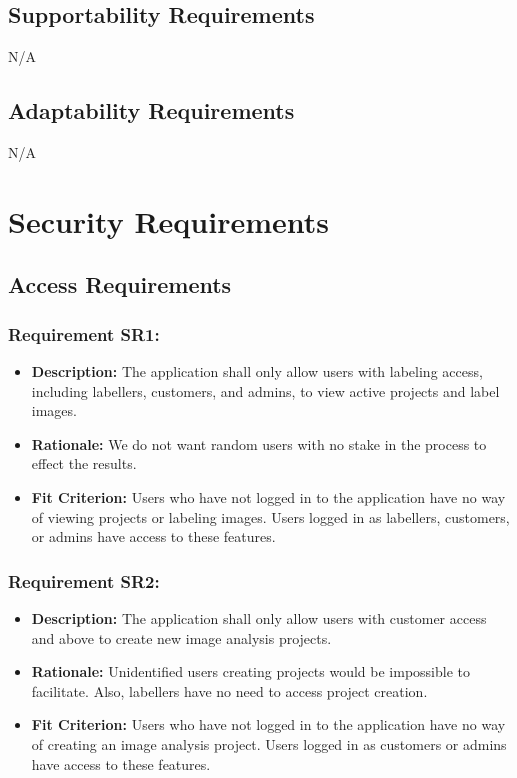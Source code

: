 \documentclass[12pt]{article}
\begin{document}
\subsection{Supportability Requirements}
N/A
\subsection{Adaptability Requirements}
N/A

\section{Security Requirements}
\subsection{Access Requirements}
\subsubsection*{Requirement SR1:}
\begin{itemize}
  \item \textbf{Description:} The application shall only allow users with labeling access, including labellers, customers, and admins, to view active projects and label images.
  \item \textbf{Rationale:} We do not want random users with no stake in the process to effect the results.
  \item \textbf{Fit Criterion:} Users who have not logged in to the application have no way of viewing projects or labeling images. Users logged in as labellers, customers, or admins have access to these features.
\end{itemize}
\subsubsection*{Requirement SR2:}
\begin{itemize}
  \item \textbf{Description:} The application shall only allow users with customer access and above to create new image analysis projects.
  \item \textbf{Rationale:} Unidentified users creating projects would be impossible to facilitate. Also, labellers have no need to access project creation. 
  \item \textbf{Fit Criterion:} Users who have not logged in to the application have no way of creating an image analysis project. Users logged in as customers or admins have access to these features.
\end{itemize}
\end{document}
